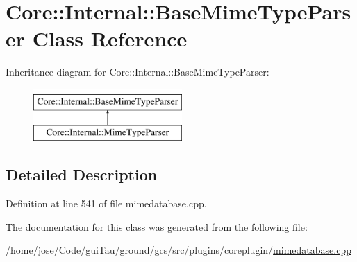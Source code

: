 \hypertarget{class_core_1_1_internal_1_1_base_mime_type_parser}{\section{Core\-:\-:Internal\-:\-:Base\-Mime\-Type\-Parser Class Reference}
\label{class_core_1_1_internal_1_1_base_mime_type_parser}
}
Inheritance diagram for Core\-:\-:Internal\-:\-:Base\-Mime\-Type\-Parser\-:\begin{figure}[H]
\begin{center}
\leavevmode
\includegraphics[height=2.000000cm]{class_core_1_1_internal_1_1_base_mime_type_parser}
\end{center}
\end{figure}


\subsection{Detailed Description}


Definition at line 541 of file mimedatabase.\-cpp.



The documentation for this class was generated from the following file\-:\begin{DoxyCompactItemize}
\item 
/home/jose/\-Code/gui\-Tau/ground/gcs/src/plugins/coreplugin/\hyperlink{mimedatabase_8cpp}{mimedatabase.\-cpp}\end{DoxyCompactItemize}
